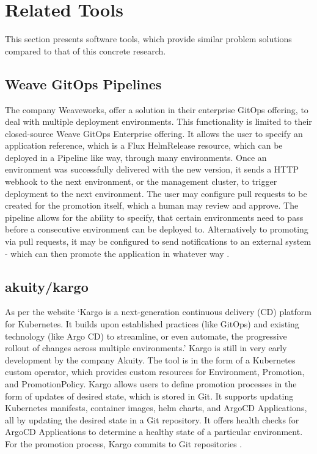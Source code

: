 \section*{Related Tools}

This section presents software tools,
which provide similar problem solutions compared to that of
this concrete research.

\subsection*{Weave GitOps Pipelines}

The company Weaveworks,
offer a solution in their enterprise GitOps offering,
to deal with multiple deployment environments.
This functionality is limited to their closed-source Weave GitOps Enterprise offering.
It allows the user to specify an application reference,
which is a Flux HelmRelease resource,
which can be deployed in a Pipeline like way,
through many environments.
Once an environment was successfully delivered with the new version,
it sends a HTTP webhook to the next environment, or the management cluster,
to trigger deployment to the next environment.
The user may configure pull requests to be created for the promotion itself,
which a human may review and approve.
The pipeline allows for the ability to specify, that certain environments need
to pass before a consecutive environment can be deployed to.
Alternatively to promoting via pull requests,
it may be configured to send notifications
to an external system -
which can then promote the application in whatever way
\autocite{weaveGitOpsPipelines}.

\subsection*{akuity/kargo}

As per the website
\enquote*{Kargo is a next-generation continuous delivery (CD) platform for Kubernetes. It builds upon established practices (like GitOps) and existing technology (like Argo CD) to streamline, or even automate, the progressive rollout of changes across multiple environments.}
\autocite{kargoAkuityWebsite}
Kargo is still in very early development by the company Akuity.
The tool is in the form of a Kubernetes custom operator, which provides custom resources
for Environment, Promotion, and PromotionPolicy.
Kargo allows users to define promotion processes in the form of updates of desired state,
which is stored in Git. It supports updating Kubernetes manifests, container images, helm charts,
and ArgoCD Applications, all by updating the desired state in a Git repository.
It offers health checks for ArgoCD Applications to determine a healthy state of a particular environment.
For the promotion process, Kargo commits to Git repositories
\autocite{kargoAkuityWebsite}.

